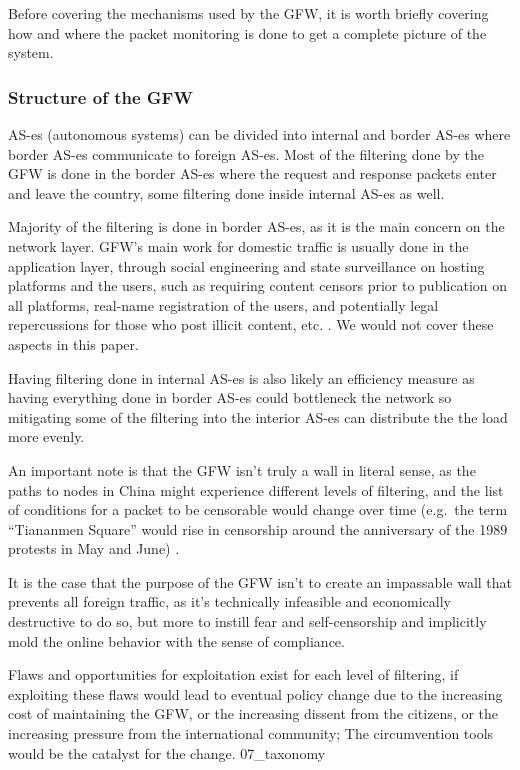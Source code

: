 Before covering the mechanisms used by the GFW, it is worth briefly
covering how and where the packet monitoring is done to get a complete
picture of the system.

\hypertarget{structure-of-the-gfw}{%
\subsubsection{Structure of the GFW}\label{structure-of-the-gfw}}

AS-es (autonomous systems) can be divided into internal and border AS-es
where border AS-es communicate to foreign AS-es. Most of the filtering
done by the GFW is done in the border AS-es \cite{03_whereFilter} where
the request and response packets enter and leave the country, some
filtering done inside internal AS-es \cite{03_whereFilter} as well.

Majority of the filtering is done in border AS-es, as it is the main
concern on the network layer. GFW's main work for domestic traffic is
usually done in the application layer, through social engineering and
state surveillance on hosting platforms and the users, such as requiring
content censors prior to publication on all platforms, real-name
registration of the users, and potentially legal repercussions for those
who post illicit content, etc. \cite{04_digitalEco_mypaper}. We would
not cover these aspects in this paper.

Having filtering done in internal AS-es is also likely an efficiency
measure as having everything done in border AS-es could bottleneck the
network so mitigating some of the filtering into the interior AS-es can
distribute the the load more evenly.

An important note is that the GFW isn't truly a wall in literal sense,
as the paths to nodes in China might experience different levels of
filtering, and the list of conditions for a packet to be censorable
would change over time (e.g.~the term ``Tiananmen Square'' would rise in
censorship around the anniversary of the 1989 protests in May and June)
\cite{05_conceptDoppler}.

It is the case that the purpose of the GFW isn't to create an impassable
wall that prevents all foreign traffic, as it's technically infeasible
and economically destructive to do so, but more to instill fear and
self-censorship and implicitly mold the online behavior with the sense
of compliance.

Flaws and opportunities for exploitation exist for each level of
filtering, if exploiting these flaws would lead to eventual policy
change due to the increasing cost of maintaining the GFW, or the
increasing dissent from the citizens, or the increasing pressure from
the international community; The circumvention tools would be the
catalyst for the change. 07\_taxonomy

